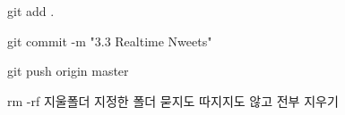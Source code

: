 git add .

git commit -m "3.3 Realtime Nweets"

git push origin master

rm -rf 지울폴더
지정한 폴더 묻지도 따지지도 않고 전부 지우기
